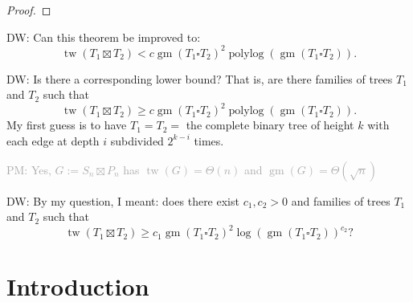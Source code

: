 \documentclass[12pt]{article}
\renewcommand{\geq}{\geqslant}
\renewcommand{\leq}{\leqslant}
\DeclareMathOperator{\polylog}{polylog}
\DeclareMathOperator{\tw}{tw}
\DeclareMathOperator{\gm}{gm}
\newcommand{\david}[1]{{\color{orange} DW: #1}}
\newcommand{\pat}[1]{\textcolor{DarkGrey}{PM: #1}}
\theoremstyle{plain}
\theoremstyle{definition}
\begin{document}
\begin{proof}



\end{proof}

\david{Can this theorem be improved to:
$$\tw(T_1\boxtimes T_2) < c \gm(T_1\square T_2)^2 \polylog(\gm(T_1\square T_2)).$$}

\david{Is there a corresponding lower bound?
That is, are there families of trees $T_1$ and $T_2$ such that
$$\tw(T_1\boxtimes T_2) \geq  c \gm(T_1\square T_2)^2 \polylog(\gm(T_1\square T_2)).$$
My first guess is to have $T_1=T_2=$ the complete binary tree of height $k$ with each edge at depth $i$ subdivided $2^{k-i}$ times.
}

\pat{Yes, $G:=S_n\boxtimes P_n$ has $\tw(G)=\Theta(n)$ and $\gm(G)=\Theta(\sqrt{n})$}

\david{By my question, I meant: does there exist $c_1,c_2>0$ and families of trees $T_1$ and $T_2$ such that
$$\tw(T_1\boxtimes T_2) \geq  c_1 \gm(T_1\square T_2)^2 \log(\gm(T_1\square T_2))^{c_2}?$$
}

\section{Introduction}
\end{document}

